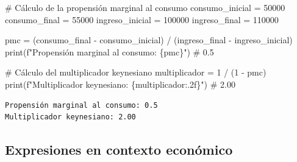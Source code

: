 \documentclass[
  doc,
  floatsintext,
  longtable,
  a4paper,
  nolmodern,
  notxfonts,
  notimes,
  12pt,
  colorlinks=true,linkcolor=blue,citecolor=blue,urlcolor=blue]{apa7}
\newenvironment{Shaded}{\begin{snugshade}}{\end{snugshade}}
\newcommand{\BuiltInTok}[1]{\textcolor[rgb]{0.00,0.23,0.31}{#1}}
\newcommand{\CommentTok}[1]{\textcolor[rgb]{0.37,0.37,0.37}{#1}}
\newcommand{\DecValTok}[1]{\textcolor[rgb]{0.68,0.00,0.00}{#1}}
\newcommand{\NormalTok}[1]{\textcolor[rgb]{0.00,0.23,0.31}{#1}}
\newcommand{\OperatorTok}[1]{\textcolor[rgb]{0.37,0.37,0.37}{#1}}
\newcommand{\SpecialCharTok}[1]{\textcolor[rgb]{0.37,0.37,0.37}{#1}}
\newcommand{\SpecialStringTok}[1]{\textcolor[rgb]{0.13,0.47,0.30}{#1}}
\begin{document}
\begin{Shaded}
\begin{Highlighting}[]
\CommentTok{\# Cálculo de la propensión marginal al consumo}
\NormalTok{consumo\_inicial }\OperatorTok{=} \DecValTok{50000}
\NormalTok{consumo\_final }\OperatorTok{=} \DecValTok{55000}
\NormalTok{ingreso\_inicial }\OperatorTok{=} \DecValTok{100000}
\NormalTok{ingreso\_final }\OperatorTok{=} \DecValTok{110000}

\NormalTok{pmc }\OperatorTok{=}\NormalTok{ (consumo\_final }\OperatorTok{{-}}\NormalTok{ consumo\_inicial) }\OperatorTok{/}\NormalTok{ (ingreso\_final }\OperatorTok{{-}}\NormalTok{ ingreso\_inicial)}
\BuiltInTok{print}\NormalTok{(}\SpecialStringTok{f"Propensión marginal al consumo: }\SpecialCharTok{\{}\NormalTok{pmc}\SpecialCharTok{\}}\SpecialStringTok{"}\NormalTok{)  }\CommentTok{\# 0.5}

\CommentTok{\# Cálculo del multiplicador keynesiano}
\NormalTok{multiplicador }\OperatorTok{=} \DecValTok{1} \OperatorTok{/}\NormalTok{ (}\DecValTok{1} \OperatorTok{{-}}\NormalTok{ pmc)}
\BuiltInTok{print}\NormalTok{(}\SpecialStringTok{f"Multiplicador keynesiano: }\SpecialCharTok{\{}\NormalTok{multiplicador}\SpecialCharTok{:.2f\}}\SpecialStringTok{"}\NormalTok{)  }\CommentTok{\# 2.00}
\end{Highlighting}
\end{Shaded}

\begin{verbatim}
Propensión marginal al consumo: 0.5
Multiplicador keynesiano: 2.00
\end{verbatim}

\subsection{Expresiones en contexto
económico}\label{expresiones-en-contexto-econuxf3mico}
\end{document}
